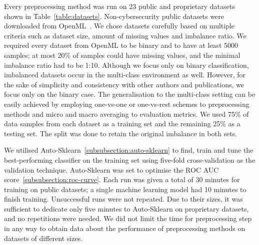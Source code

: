 \documentclass[conference]{IEEEtran}
\begin{document}
Every preprocessing method was run on 23 public and proprietary datasets shown in
Table~\ref{table:datasets}. Non-cybersecurity public datasets were downloaded from
OpenML~\cite{openml}. We chose datasets carefully based on multiple criteria such as dataset size,
amount of missing values and imbalance ratio. We required every dataset from OpenML to be binary
and to have at least 5000 samples; at most 20\% of samples could have missing values, and the
minimal imbalance ratio had to be 1:10. Although we focus only on binary classification, imbalanced
datasets occur in the multi-class environment as well. However, for the sake of simplicity and
consistency with other authors and publications, we focus only on the binary case. The
generalisation to the multi-class setting can be easily achieved by employing one-vs-one or
one-vs-rest schemes to preprocessing methods and micro and macro averaging to evaluation metrics.
We used 75\% of data samples from each dataset as a training set and the remaining 25\% as a
testing set. The split was done to retain the original imbalance in both sets.

We utilised Auto-Sklearn~\ref{subsubsection:auto-sklearn} to find, train and tune the
best-performing classifier on the training set using five-fold cross-validation as the validation
technique. Auto-Sklearn was set to optimise the ROC AUC score~\ref{subsubsection:roc-curve}. Each
run was given a total of 30 minutes for training on public datasets; a single machine learning
model had 10 minutes to finish training. Unsuccessful runs were not repeated. Due to their sizes,
it was sufficient to dedicate only five minutes to Auto-Sklearn on proprietary datasets, and no
repetitions were needed. We did not limit the time for preprocessing step in any way to obtain data
about the performance of preprocessing methods on datasets of different sizes.
\end{document}
